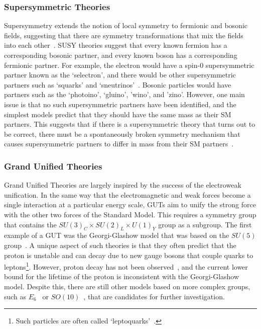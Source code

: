 \subsubsection{Supersymmetric Theories}

Supersymmetry extends the notion of local symmetry to fermionic and bosonic fields, suggesting that there are symmetry transformations that mix the fields into each other~\cite{Wess197452}.
SUSY theories suggest that every known fermion has a corresponding bosonic partner, and every known boson has a corresponding fermionic partner.
For example, the electron would have a spin-0 supersymmetric partner known as the `selectron', and there would be other supersymmetric partners such as `squarks' and `sneutrinos'~\cite{Martin_1998}.
Bosonic particles would have partners such as the `photoino', `gluino', 'wino', and 'zino'.
However, one main issue is that no such supersymmetric partners have been identified, and the simplest models predict that they should have the same mass as their SM partners.
This suggests that if there is a supersymmetric theory that turns out to be correct, there must be a spontaneously broken symmetry mechanism that causes supersymmetric partners to differ in mass from their SM partners~\cite{dine_2007}.

\subsubsection{Grand Unified Theories}

Grand Unified Theories are largely inspired by the success of the electroweak unification.
In the same way that the electromagnetic and weak forces become a single interaction at a particular energy scale, GUTs aim to unify the strong force with the other two forces of the Standard Model.
This requires a symmetry group that contains the $SU(3)_C\times SU(2)_L\times U(1)_Y$ group as a subgroup.
The first example of a GUT was the Georgi-Glashow model that was based on the $SU(5)$ group~\cite{PhysRevLett.32.438}.
A unique aspect of such theories is that they often predict that the proton is unstable and can decay due to new gauge bosons that couple quarks to leptons\footnote{Such particles are often called `leptoquarks'~\cite{Diaz_2017}.}.
However, proton decay has not been observed~\cite{PhysRevLett.81.3319}, and the current lower bound for the lifetime of the proton is inconsistent with the Georgi-Glashow model.
Despite this, there are still other models based on more complex groups, such as $E_6$~\cite{Hewett1989193} or $SO(10)$~\cite{Cveti__1997}, that are candidates for further investigation.

